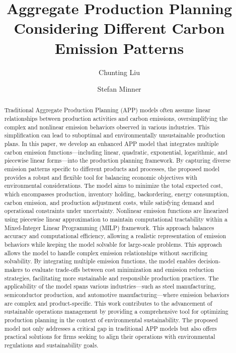 \documentclass[final,3p,times,review,authoryear]{elsarticle}
\begin{document}
\begin{frontmatter}


\title{Aggregate Production Planning Considering Different Carbon Emission Patterns}

\author[tum]{Chunting Liu}
\author[tum,mdsi]{Stefan Minner}

\address[tum]{Logistics \& Supply Chain Management, TUM School of Management, Technical University of Munich, Germany}

\address[mdsi]{Munich Data Science Institute (MDSI), Technical University of Munich, Germany}


\begin{abstract}
Traditional Aggregate Production Planning (APP) models often assume linear relationships between production activities and carbon emissions, oversimplifying the complex and nonlinear emission behaviors observed in various industries. This simplification can lead to suboptimal and environmentally unsustainable production plans. In this paper, we develop an enhanced APP model that integrates multiple carbon emission functions—including linear, quadratic, exponential, logarithmic, and piecewise linear forms—into the production planning framework. By capturing diverse emission patterns specific to different products and processes, the proposed model provides a robust and flexible tool for balancing economic objectives with environmental considerations.
The model aims to minimize the total expected cost, which encompasses production, inventory holding, backordering, energy consumption, carbon emission, and production adjustment costs, while satisfying demand and operational constraints under uncertainty. Nonlinear emission functions are linearized using piecewise linear approximation to maintain computational tractability within a Mixed-Integer Linear Programming (MILP) framework. This approach balances accuracy and computational efficiency, allowing a realistic representation of emission behaviors while keeping the model solvable for large-scale problems. This approach allows the model to handle complex emission relationships without sacrificing solvability.
By integrating multiple emission functions, the model enables decision-makers to evaluate trade-offs between cost minimization and emission reduction strategies, facilitating more sustainable and responsible production practices. The applicability of the model spans various industries—such as steel manufacturing, semiconductor production, and automotive manufacturing—where emission behaviors are complex and product-specific. This work contributes to the advancement of sustainable operations management by providing a comprehensive tool for optimizing production planning in the context of environmental sustainability. The proposed model not only addresses a critical gap in traditional APP models but also offers practical solutions for firms seeking to align their operations with environmental regulations and sustainability goals.
\end{abstract}


\end{frontmatter}
\end{document}
